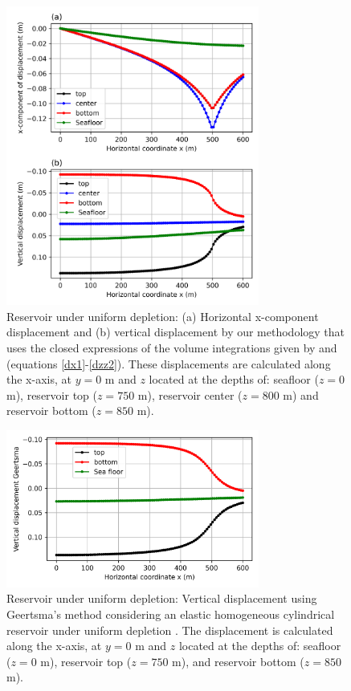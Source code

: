 \documentclass[journal abbreviation, manuscript]{copernicus}
\begin{document}
\begin{figure}[ht]
\includegraphics[width=8.3cm]{Fig/Figure_Displacement_z_levels.png}
\caption{Reservoir under uniform depletion: (a) Horizontal x-component displacement and (b) vertical displacement by our methodology that uses the closed expressions of the volume integrations given by \cite{Nagyetal2000} and \cite{Nagyetal2002} (equations \ref{dx1}-\ref{dzz2}).
These displacements are calculated along the x-axis, at $y = 0$ m and $z$ located at the depths of:  seafloor ($z = 0$ m), reservoir top ($z = 750$ m), reservoir center ($z = 800$ m) and reservoir bottom ($z = 850$ m).}
\label{fig:displacement_z_levels}
\end{figure}

\begin{figure}[ht]
\includegraphics[width=8.3cm]{Fig/Figure_Displacement_z_levels_Geertsma.png}
\caption{Reservoir under uniform depletion: Vertical displacement using Geertsma’s method \citep{Geertsma73}  considering an elastic homogeneous cylindrical reservoir under uniform depletion \citep{Fjaer08}.
The displacement is calculated along the x-axis, at $y = 0$ m and $z$ located at the depths of:  seafloor ($z = 0$ m), reservoir top ($z = 750$ m), and reservoir bottom 
($z = 850$ m).}
\label{fig:displacement_z_levels_Geertsma}
\end{figure}
\end{document}
